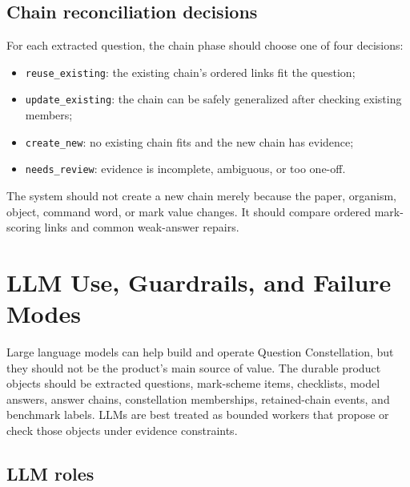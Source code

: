 \documentclass[11pt]{article}
\begin{document}
\subsection{Chain reconciliation decisions}

For each extracted question, the chain phase should choose one of four decisions:

\begin{itemize}
\item \texttt{reuse\_existing}: the existing chain's ordered links fit the question;
\item \texttt{update\_existing}: the chain can be safely generalized after checking existing members;
\item \texttt{create\_new}: no existing chain fits and the new chain has evidence;
\item \texttt{needs\_review}: evidence is incomplete, ambiguous, or too one-off.
\end{itemize}

The system should not create a new chain merely because the paper, organism, object, command word, or mark value changes. It should compare ordered mark-scoring links and common weak-answer repairs.

\section{LLM Use, Guardrails, and Failure Modes}

Large language models can help build and operate Question Constellation, but they should not be the product's main source of value. The durable product objects should be extracted questions, mark-scheme items, checklists, model answers, answer chains, constellation memberships, retained-chain events, and benchmark labels. LLMs are best treated as bounded workers that propose or check those objects under evidence constraints.

\subsection{LLM roles}
\end{document}
